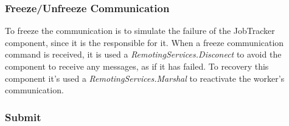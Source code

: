 \documentclass[times, 10pt,twocolumn]{article}
\begin{document}
          \subsubsection{Freeze/Unfreeze Communication}
          
          To freeze the communication is to simulate the failure of the JobTracker component, since it is the responsible for it. When a freeze communication command is received, it is used a \emph{RemotingServices.Disconect} to avoid the component to receive any messages, as if it has failed. To recovery this component it's used a \emph{RemotingServices.Marshal} to reactivate the worker's communication.

            \subsubsection{Submit}
            
\end{document}
